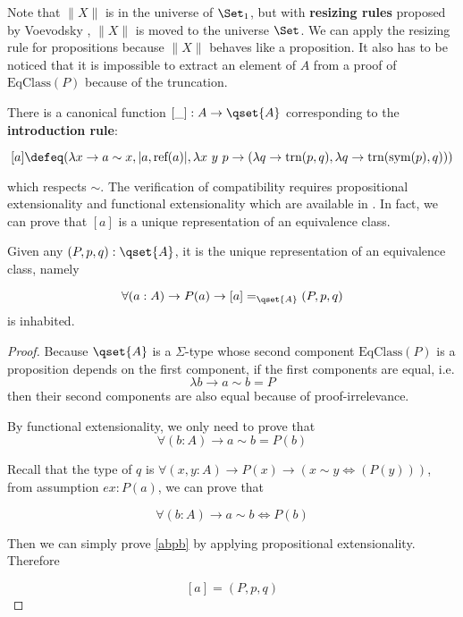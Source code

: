 \begin{remark}
Note that $\|X\|$ is in the universe of $\Set_1$, but with
\textbf{resizing rules} proposed by Voevodsky \cite{Universe-poly,RR},
$\|X\|$ is moved to the universe $\Set$. We can apply the resizing
rule for propositions because $\|X\|$ behaves like a proposition.  It
also has to be noticed that it is impossible to extract an element of
$A$ from a proof of $\text{EqClass}(P)$ because of the truncation.
\end{remark}

There is a canonical function $[\_] : A \to \qset{A}$ corresponding to the \textbf{introduction rule}:

$$[ a ] \defeq (\lambda x \to a \sim x, | a, \text{ref}(a) | , \lambda x~y ~p \to (\lambda q \to\text{trn}(p,q), \lambda q \to \text{trn}(\text{sym}(p),q)))$$

which respects $\sim$. The verification of compatibility requires
propositional extensionality and functional extensionality which are
available in \hott.  In fact, we can prove that $[a]$ is a unique
representation of an equivalence class.

\begin{lemma}\label{uniquerepresentation}
Given any $(P,p,q) : \qset{A}$, it is the unique representation of an equivalence class, namely

$$\forall (a : A) \to P(a) \to [a] =_{\qset{A}} (P,p,q)$$ is inhabited.
\end{lemma}
\begin{proof}

Because $\qset{A}$ is a $\Sigma$-type whose second component $\text{EqClass}(P)$ is a proposition depends on the first component, if the first components are equal, i.e.
$$\lambda b \to a \sim b = P$$
then their second components are also equal because of proof-irrelevance.

By functional extensionality, we only need to prove that
\begin{equation}\label{abpb}
\forall(b : A) \to a \sim b = P(b)
\end{equation}

Recall that the type of $q$ is $\forall(x,y : A) \to P(x) \to (x \sim y \iff (P(y)))$, from assumption $ex : P(a)$, we can prove that 


$$\forall(b : A) \to a \sim b \iff P(b)$$

Then we can simply prove \ref{abpb} by applying propositional extensionality.
Therefore

$$[a] = (P,p,q)$$ 

\end{proof}

